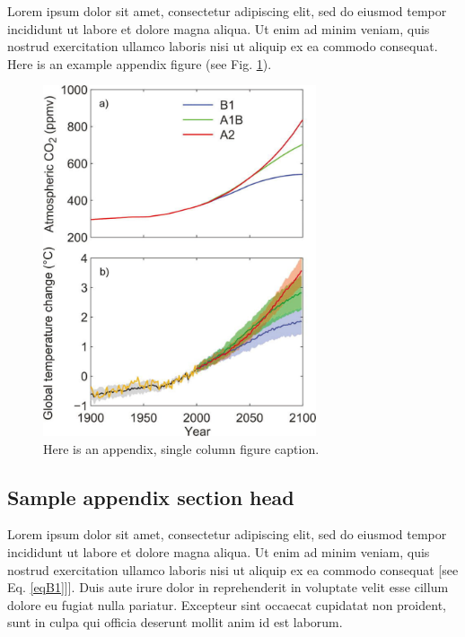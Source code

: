 \documentclass{ametsocv6.1}
\begin{document}
Lorem ipsum dolor sit amet, consectetur adipiscing elit, sed do eiusmod tempor incididunt ut labore et dolore magna aliqua. Ut enim ad minim veniam, quis nostrud exercitation ullamco laboris nisi ut aliquip ex ea commodo consequat. Here is an example appendix figure (see Fig. \ref{figA1}).
\begin{figure}
 \centerline{\includegraphics[width=19pc]{figure01.pdf}}
\caption{Here is an appendix, single column figure caption.}\label{figA1}
\end{figure}

\appendix[B]
\subsection{Sample appendix section head}
Lorem ipsum dolor sit amet, consectetur adipiscing elit, sed do eiusmod tempor incididunt ut labore et dolore magna aliqua. Ut enim ad minim veniam, quis nostrud exercitation ullamco laboris nisi ut aliquip ex ea commodo consequat [see Eq. \eqref{eqB1}]]. Duis aute irure dolor in reprehenderit in voluptate velit esse cillum dolore eu fugiat nulla pariatur. Excepteur sint occaecat cupidatat non proident, sunt in culpa qui officia deserunt mollit anim id est laborum.
\end{document}
